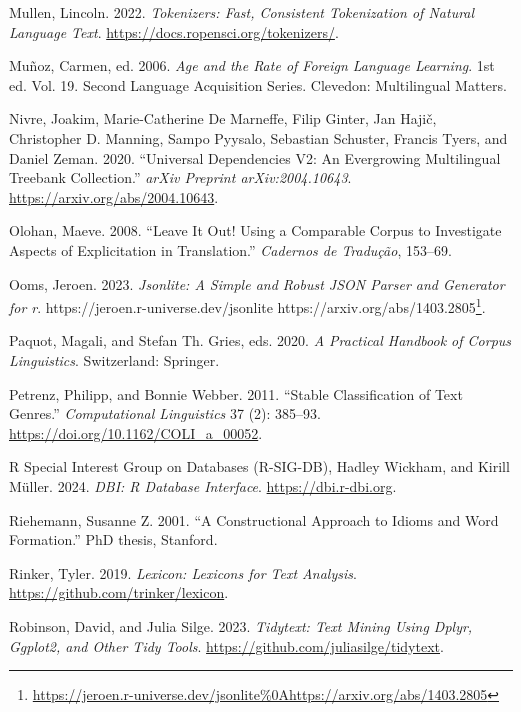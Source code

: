 \documentclass[
  letterpaper,
]{latex/krantz}
\newlength{\cslhangindent}
\newenvironment{CSLReferences}[2] %
 {\begin{list}{}{%
  \setlength{\itemindent}{0pt}
  \setlength{\leftmargin}{0pt}
  \setlength{\parsep}{0pt}
  \ifodd #1
   \setlength{\leftmargin}{\cslhangindent}
   \setlength{\itemindent}{-1\cslhangindent}
  \fi
  \setlength{\itemsep}{#2\baselineskip}}}
 {\end{list}}
\theoremstyle{definition}
\theoremstyle{remark}
\DeclareRobustCommand{\href}[2]{#2\footnote{\url{#1}}}
\begin{document}
\begin{CSLReferences}{1}{0}
Mullen, Lincoln. 2022. \emph{Tokenizers: Fast, Consistent Tokenization
of Natural Language Text}. \url{https://docs.ropensci.org/tokenizers/}.

Muñoz, Carmen, ed. 2006. \emph{Age and the Rate of Foreign Language
Learning}. 1st ed. Vol. 19. Second Language Acquisition Series.
Clevedon: Multilingual Matters.

Nivre, Joakim, Marie-Catherine De Marneffe, Filip Ginter, Jan Hajič,
Christopher D. Manning, Sampo Pyysalo, Sebastian Schuster, Francis
Tyers, and Daniel Zeman. 2020. {``Universal Dependencies V2: An
Evergrowing Multilingual Treebank Collection.''} \emph{arXiv Preprint
arXiv:2004.10643}. \url{https://arxiv.org/abs/2004.10643}.

Olohan, Maeve. 2008. {``Leave It Out! Using a Comparable Corpus to
Investigate Aspects of Explicitation in Translation.''} \emph{Cadernos
de Tradu{ç}{ã}o}, 153--69.

Ooms, Jeroen. 2023. \emph{Jsonlite: A Simple and Robust JSON Parser and
Generator for r}.
\href{https://jeroen.r-universe.dev/jsonlite\%0Ahttps://arxiv.org/abs/1403.2805}{https://jeroen.r-universe.dev/jsonlite
https://arxiv.org/abs/1403.2805}.

Paquot, Magali, and Stefan Th. Gries, eds. 2020. \emph{A Practical
Handbook of Corpus Linguistics}. Switzerland: Springer.

Petrenz, Philipp, and Bonnie Webber. 2011. {``Stable Classification of
Text Genres.''} \emph{Computational Linguistics} 37 (2): 385--93.
\url{https://doi.org/10.1162/COLI_a_00052}.

R Special Interest Group on Databases (R-SIG-DB), Hadley Wickham, and
Kirill Müller. 2024. \emph{DBI: R Database Interface}.
\url{https://dbi.r-dbi.org}.

Riehemann, Susanne Z. 2001. {``A Constructional Approach to Idioms and
Word Formation.''} PhD thesis, Stanford.

Rinker, Tyler. 2019. \emph{Lexicon: Lexicons for Text Analysis}.
\url{https://github.com/trinker/lexicon}.

Robinson, David, and Julia Silge. 2023. \emph{Tidytext: Text Mining
Using Dplyr, Ggplot2, and Other Tidy Tools}.
\url{https://github.com/juliasilge/tidytext}.


\end{CSLReferences}
\end{document}
